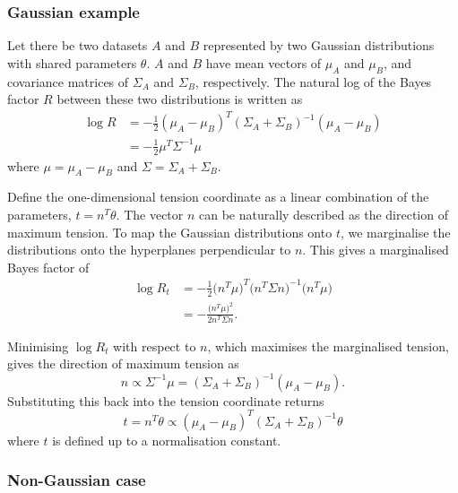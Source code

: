\documentclass[%
 reprint,
 amsmath,amssymb,
 aps,
]{revtex4-2}
\begin{document}
\subsubsection{Gaussian example} \label{gaussian_tension}

Let there be two datasets $A$ and $B$ represented by two Gaussian distributions with shared parameters $\theta$. $A$ and $B$ have mean vectors of $\mu_A$ and $\mu_B$, and covariance matrices of $\Sigma_A$ and $\Sigma_B$, respectively. The natural log of the Bayes factor $R$ between these two distributions is written as \cite{Handley2019}
\begin{align}
    \log R &= - \frac{1}{2} (\mu_A - \mu_B)^T (\Sigma_A + \Sigma_B)^{-1} (\mu_A - \mu_B) \\
    &= - \frac{1}{2} \mu^T \Sigma^{-1} \mu
\end{align}
where $\mu = \mu_A - \mu_B$ and $\Sigma = \Sigma_A + \Sigma_B$.

Define the one-dimensional tension coordinate as a linear combination of the parameters, $t = n^T \theta$. The vector $n$ can be naturally described as the direction of maximum tension. To map the Gaussian distributions onto $t$, we marginalise the distributions onto the hyperplanes perpendicular to $n$. This gives a marginalised Bayes factor of
\begin{align}
    \log R_t &= -\frac{1}{2} \big( n^T \mu \big)^T \big( n^T \Sigma n \big)^{-1} \big( n^T \mu \big) \\
    &= -\frac{\big( n^T \mu \big)^2}{2 n^T \Sigma n}.
\end{align}

Minimising $\log R_t$ with respect to $n$, which maximises the marginalised tension, gives the direction of maximum tension as
\begin{equation}
    n \propto \Sigma^{-1} \mu = (\Sigma_A + \Sigma_B)^{-1} (\mu_A - \mu_B).
\end{equation}
Substituting this back into the tension coordinate returns
\begin{equation}
    t = n^T \theta \propto (\mu_A - \mu_B)^T (\Sigma_A + \Sigma_B)^{-1} \theta
\end{equation}
where $t$ is defined up to a normalisation constant.

\subsubsection{Non-Gaussian case} \label{non_gaussian}
\end{document}
